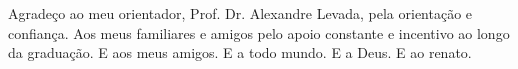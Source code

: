 
\begin{agradecimentos}
Agradeço ao meu orientador, Prof. Dr. Alexandre Levada, pela orientação e confiança.
Aos meus familiares e amigos pelo apoio constante e incentivo ao longo da graduação.
E aos meus amigos. E a todo mundo. E a Deus. E ao renato.
\end{agradecimentos}
